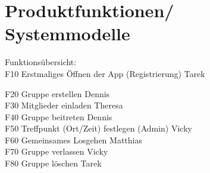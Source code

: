 \section{Produktfunktionen/ Systemmodelle}
Funktionsübersicht: \\
F10 Erstmaliges Öffnen der App (Registrierung) Tarek \\

\begin{figure}
	
	
\end{figure}



F20 Gruppe erstellen Dennis \\
F30 Mitglieder einladen Theresa \\
F40 Gruppe beitreten Dennis \\
F50 Treffpunkt (Ort/Zeit) festlegen (Admin) Vicky \\
F60 Gemeinsames Losgehen Matthias \\
F70 Gruppe verlassen Vicky \\
F80 Gruppe löschen Tarek \\
